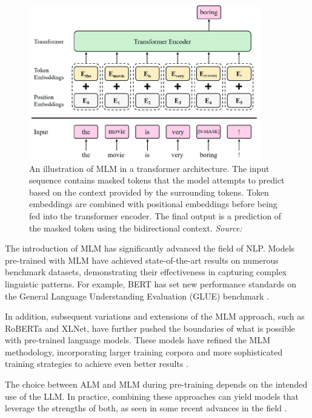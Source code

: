 \begin{figure}[h]
    \centering
    \includegraphics[width=0.9\textwidth]{images/llms/Model-structure-of-the-label-masked-language-model-N-MASK-is-a-mask-token-containing.png}
    \caption{An illustration of MLM in a transformer architecture. The input sequence contains masked tokens that the model attempts to predict based on the context provided by the surrounding tokens. Token embeddings are combined with positional embeddings before being fed into the transformer encoder. The final output is a prediction of the masked token using the bidirectional context. \textit{Source:} \cite{park2019}}
    \label{fig:mlm_architecture}
\end{figure}

The introduction of MLM has significantly advanced the field of NLP. Models pre-trained with MLM have achieved state-of-the-art results on numerous benchmark datasets, demonstrating their effectiveness in capturing complex linguistic patterns. For example, BERT has set new performance standards on the General Language Understanding Evaluation (GLUE) benchmark \cite{wang2018glue}.

In addition, subsequent variations and extensions of the MLM approach, such as RoBERTa and XLNet, have further pushed the boundaries of what is possible with pre-trained language models. These models have refined the MLM methodology, incorporating larger training corpora and more sophisticated training strategies to achieve even better results \cite{liu2019roberta, yang2019xlnet}.

The choice between ALM and MLM during pre-training depends on the intended use of the LLM. In practice, combining these approaches can yield models that leverage the strengths of both, as seen in some recent advances in the field \cite{lewis2019bart}.

